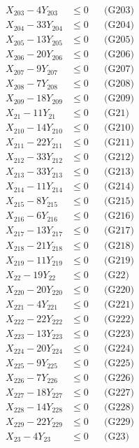 \documentclass[a4paper,10pt]{article}
\begin{document}
{\begin{align}
X_{203} - 4Y_{203} &\leq 0 && \text{(G203)} \\
X_{204} - 33Y_{204} &\leq 0 && \text{(G204)} \\
X_{205} - 13Y_{205} &\leq 0 && \text{(G205)} \\
\allowbreak
X_{206} - 20Y_{206} &\leq 0 && \text{(G206)} \\
X_{207} - 9Y_{207} &\leq 0 && \text{(G207)} \\
X_{208} - 7Y_{208} &\leq 0 && \text{(G208)} \\
X_{209} - 18Y_{209} &\leq 0 && \text{(G209)} \\
X_{21} - 11Y_{21} &\leq 0 && \text{(G21)} \\
X_{210} - 14Y_{210} &\leq 0 && \text{(G210)} \\
X_{211} - 22Y_{211} &\leq 0 && \text{(G211)} \\
X_{212} - 33Y_{212} &\leq 0 && \text{(G212)} \\
X_{213} - 33Y_{213} &\leq 0 && \text{(G213)} \\
X_{214} - 11Y_{214} &\leq 0 && \text{(G214)} \\
X_{215} - 8Y_{215} &\leq 0 && \text{(G215)} \\
X_{216} - 6Y_{216} &\leq 0 && \text{(G216)} \\
X_{217} - 13Y_{217} &\leq 0 && \text{(G217)} \\
X_{218} - 21Y_{218} &\leq 0 && \text{(G218)} \\
X_{219} - 11Y_{219} &\leq 0 && \text{(G219)} \\
X_{22} - 19Y_{22} &\leq 0 && \text{(G22)} \\
X_{220} - 20Y_{220} &\leq 0 && \text{(G220)} \\
X_{221} - 4Y_{221} &\leq 0 && \text{(G221)} \\
X_{222} - 22Y_{222} &\leq 0 && \text{(G222)} \\
X_{223} - 13Y_{223} &\leq 0 && \text{(G223)} \\
\allowbreak
X_{224} - 20Y_{224} &\leq 0 && \text{(G224)} \\
X_{225} - 9Y_{225} &\leq 0 && \text{(G225)} \\
X_{226} - 7Y_{226} &\leq 0 && \text{(G226)} \\
X_{227} - 18Y_{227} &\leq 0 && \text{(G227)} \\
X_{228} - 14Y_{228} &\leq 0 && \text{(G228)} \\
X_{229} - 22Y_{229} &\leq 0 && \text{(G229)} \\
X_{23} - 4Y_{23} &\leq 0 && \text{(G23)} \\

\end{align}}
\end{document}
